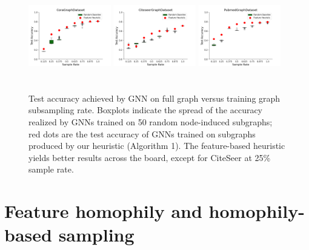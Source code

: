 \documentclass[conference]{IEEEtran}
\theoremstyle{definition}
\begin{document}
\begin{figure}[t]
\centering
\includegraphics[height=4cm,width=0.32\textwidth]{img/GNN_acc_revised/CoraGraphDataset_undirected_random_baseline_boxplot.png}
\includegraphics[height=4cm,width=0.32\textwidth]{img/GNN_acc_revised/CiteseerGraphDataset_undirected_random_baseline_boxplot.png}
\includegraphics[height=4cm,width=0.32\textwidth]{img/GNN_acc_revised/PubmedGraphDataset_undirected_random_baseline_boxplot.png}
\caption{Test accuracy achieved by GNN on full graph versus training graph subsampling rate. Boxplots indicate the spread of the accuracy realized by GNNs trained on 50 random node-induced subgraphs; red dots are the test accuracy of GNNs trained on subgraphs produced by our heuristic (Algorithm 1). The feature-based heuristic yields better results across the board, except for CiteSeer at 25\% sample rate.}
\label{fig:GNN Acc}
\end{figure}

\section{Feature homophily and homophily-based sampling}
\end{document}
